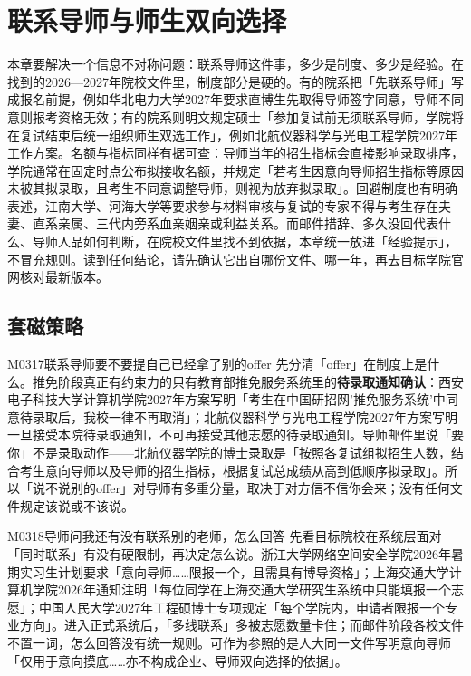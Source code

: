 \chapter{联系导师与师生双向选择}
\label{ch06}
\begin{keybox}
本章要解决一个信息不对称问题：联系导师这件事，多少是制度、多少是经验。在找到的2026—2027年院校文件里，制度部分是硬的。有的院系把「先联系导师」写成报名前提，例如华北电力大学2027年要求直博生先取得导师签字同意，导师不同意则报考资格无效；有的院系则明文规定硕士「参加复试前无须联系导师，学院将在复试结束后统一组织师生双选工作」，例如北航仪器科学与光电工程学院2027年工作方案。名额与指标同样有据可查：导师当年的招生指标会直接影响录取排序，学院通常在固定时点公布拟接收名额，并规定「若考生因意向导师招生指标等原因未被其拟录取，且考生不同意调整导师，则视为放弃拟录取」。回避制度也有明确表述，江南大学、河海大学等要求参与材料审核与复试的专家不得与考生存在夫妻、直系亲属、三代内旁系血亲姻亲或利益关系。而邮件措辞、多久没回代表什么、导师人品如何判断，在院校文件里找不到依据，本章统一放进「经验提示」，不冒充规则。读到任何结论，请先确认它出自哪份文件、哪一年，再去目标学院官网核对最新版本。
\end{keybox}

\section{套磁策略}
\begin{qa}{M0317}{联系导师要不要提自己已经拿了别的offer}
先分清「offer」在制度上是什么。推免阶段真正有约束力的只有教育部推免服务系统里的\textbf{待录取通知确认}：西安电子科技大学计算机学院2027年方案写明「考生在中国研招网'推免服务系统'中同意待录取后，我校一律不再取消」；北航仪器科学与光电工程学院2027年方案写明一旦接受本院待录取通知，不可再接受其他志愿的待录取通知。导师邮件里说「要你」不是录取动作——北航仪器学院的博士录取是「按照各复试组拟招生人数，结合考生意向导师以及导师的招生指标，根据复试总成绩从高到低顺序拟录取」。所以「说不说别的offer」对导师有多重分量，取决于对方信不信你会来；没有任何文件规定该说或不该说。
\end{qa}

\begin{qa}{M0318}{导师问我还有没有联系别的老师，怎么回答}
先看目标院校在系统层面对「同时联系」有没有硬限制，再决定怎么说。浙江大学网络空间安全学院2026年暑期实习生计划要求「意向导师……限报一个，且需具有博导资格」；上海交通大学计算机学院2026年通知注明「每位同学在上海交通大学研究生系统中只能填报一个志愿」；中国人民大学2027年工程硕博士专项规定「每个学院内，申请者限报一个专业方向」。进入正式系统后，「多线联系」多被志愿数量卡住；而邮件阶段各校文件不置一词，怎么回答没有统一规则。可作为参照的是人大同一文件写明意向导师「仅用于意向摸底……亦不构成企业、导师双向选择的依据」。
\end{qa}

